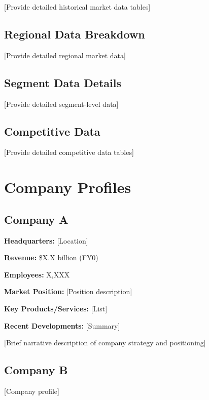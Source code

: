 \documentclass[11pt,letterpaper]{report}
\newcommand{\baseyear}{0}
\begin{document}
[Provide detailed historical market data tables]

\section{Regional Data Breakdown}

[Provide detailed regional market data]

\section{Segment Data Details}

[Provide detailed segment-level data]

\section{Competitive Data}

[Provide detailed competitive data tables]

\chapter{Company Profiles}

\section{Company A}

\begin{calloutbox}
\textbf{Headquarters:} [Location]

\textbf{Revenue:} \$X.X billion (FY\baseyear{})

\textbf{Employees:} X,XXX

\textbf{Market Position:} [Position description]

\textbf{Key Products/Services:} [List]

\textbf{Recent Developments:} [Summary]
\end{calloutbox}

[Brief narrative description of company strategy and positioning]

\section{Company B}
[Company profile]
\end{document}
